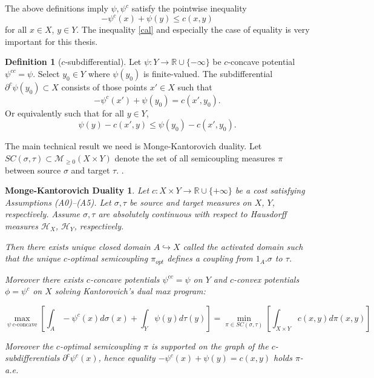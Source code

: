 \documentclass[12pt]{amsart}
\newtheorem*{mkthm}{Monge-Kantorovich Duality}
\theoremstyle{definition}
\newtheorem{dfn}{Definition}
\theoremstyle{remark}
\newcommand{\bR}{\mathbb{R}}
\newcommand{\del}{\partial}
\newcommand{\sH}{\mathscr{H}}
\begin{document}
The above definitions imply $\psi, \psi^c$ satisfy the pointwise inequality 
\begin{equation} 
-\psi^c (x)+\psi(y) \leq c(x,y) \label{cal}
\end{equation}
 for all $x \in X$, $y\in Y$. The inequality \eqref{cal} and especially the case of equality is very important for this thesis.
\begin{dfn}
[$c$-subdifferential]\label{subdif}
Let $\psi: Y\to \bR \cup \{-\infty\}$ be $c$-concave potential $\psi^{cc}=\psi$. Select $y_0\in Y$ where $\psi(y_0)$ is finite-valued. The subdifferential $\del^c \psi(y_0) \subset X$ consists of those points $x'\in X$ such that $$-\psi^c(x')+\psi(y_0) = c(x', y_0).$$ Or equivalently such that for all $y\in Y$, $$\psi(y)-c(x',y) \leq \psi(y_0)-c(x',y_0).$$
\end{dfn}



The main technical result we need is Monge-Kantorovich duality. Let $SC(\sigma, \tau) \subset \mathscr{M}_{\geq 0} (X \times Y)$ denote the set of all semicoupling measures $\pi$ between source $\sigma$ and target $\tau$.
\cite[Theorem 5.10, pp.57]{Vil1}.
\begin{mkthm}\label{maxI}
Let $c: X\times Y \to \bR\cup\{+\infty\}$ be a cost satisfying Assumptions (A0)--(A5). Let $\sigma, \tau$ be source and target measures on $X$, $Y$, respectively. Assume $\sigma, \tau$ are absolutely continuous with respect to Hausdorff measures $\sH_X$, $\sH_Y$, respectively. 

Then there exists unique closed domain $A\hookrightarrow X$ called the activated domain such that the unique $c$-optimal semicoupling $\pi_{opt}$ defines a coupling from $1_A.\sigma$ to $\tau$. 

Moreover there exists $c$-concave potentials $\psi^{cc}=\psi$ on $Y$ and $c$-convex potentials $\phi=\psi^c$ on $X$ solving Kantorovich's dual max program: 

\begin{equation}
\max_{\psi ~c\text{-concave}} [\int_A -\psi^c(x) d\sigma(x) + \int_Y \psi(y) d\tau(y)]= \min_{\pi\in SC(\sigma, \tau)} [ \int_{X\times Y} c(x,y) d\pi(x,y)] 
\label{mkdualeq}\end{equation}

Moreover the $c$-optimal semicoupling $\pi$ is supported on the graph of the $c$-subdifferentials $\del^c \psi^c(x)$, hence equality $-\psi^c(x)+\psi(y)=c(x,y)$ holds $\pi$-a.e.

\end{mkthm}
\end{document}
